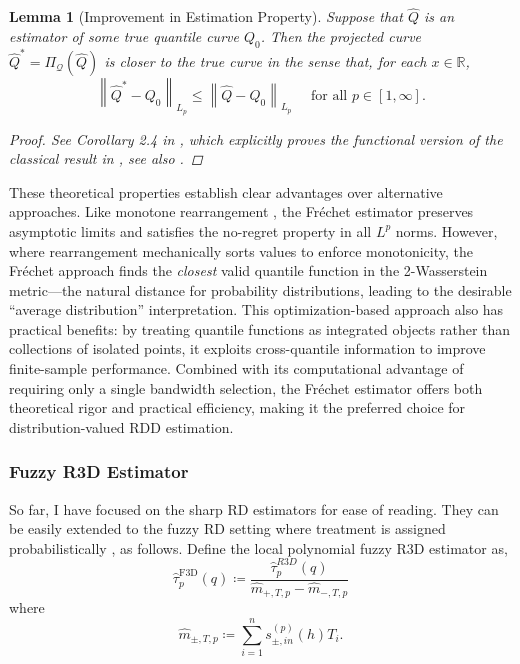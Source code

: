 \documentclass[12pt]{article}
\newtheorem{lemma}{Lemma}
\begin{document}
\begin{lemma}[Improvement in Estimation Property] \label{lemma:no_regret}
Suppose that $\hat{Q}$ is an estimator of some true quantile curve $Q_0$. Then the projected curve $\hat{Q}^* = \Pi_{\mathcal{Q}}(\hat{Q})$ is closer to the true curve in the sense that, for each $x \in \mathbb{R}$, 
$$
\left\| \hat{Q}^*-Q_0\right\|_{L_p} \leq\left\|\hat{Q}-Q_0\right\|_{L_p} \quad \text { for all } p \in[1, \infty].
$$
\begin{proof}
See Corollary 2.4 in \citet{lin2019projection}, which explicitly proves the functional version of the classical result in \citet[Theorem 1.6.1]{Robertson1988}, see also \citet[Theorem 2.1]{groeneboom2014nonparametric}.
\end{proof}
\end{lemma}


These theoretical properties establish clear advantages over alternative approaches. Like monotone rearrangement \citep{chernozhukov2010quantile}, the Fr\'echet estimator preserves asymptotic limits and satisfies the no-regret property in all $L^p$ norms. However, where rearrangement mechanically sorts values to enforce monotonicity, the Fr\'echet approach finds the \emph{closest} valid quantile function in the 2-Wasserstein metric---the natural distance for probability distributions, leading to the desirable ``average distribution'' interpretation. This optimization-based approach also has practical benefits: by treating quantile functions as integrated objects rather than collections of isolated points, it exploits cross-quantile information to improve finite-sample performance. Combined with its computational advantage of requiring only a single bandwidth selection, the Fr\'echet estimator offers both theoretical rigor and practical efficiency, making it the preferred choice for distribution-valued RDD estimation.


\subsubsection{Fuzzy R3D Estimator}

So far, I have focused on the sharp RD estimators for ease of reading. They can be easily extended to the fuzzy RD setting where treatment is assigned probabilistically \citep{hahn2001identification}, as follows. Define the local polynomial fuzzy R3D estimator as,
\begin{equation} \label{eq:estimator_F3D}
\hat{\tau}^{\mathrm{F3D}}_p(q) \coloneqq \frac{\hat{\tau}_p^{R3D}(q)}{\hat{m}_{+,T,p} - \hat{m}_{-,T,p}}
\end{equation}
where 
\begin{equation*}
\hat{m}_{ \pm, T, p} \coloneqq \sum_{i=1}^n s_{ \pm, i n}^{(p)}(h) T_i.
\end{equation*}
\end{document}
